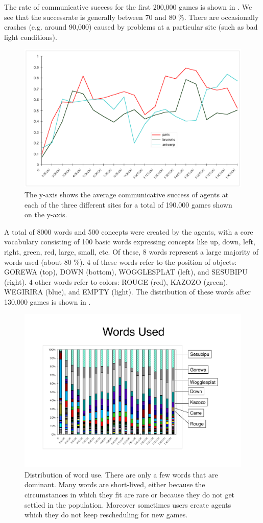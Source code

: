 The rate of communicative success for the first 200,000 games is shown in . We see that the successrate is generally between 70 and 80 \%. There are occasionally crashes (e.g. around 90,000) caused by problems at a particular site (such as bad light conditions). 


\begin{figure}[htbp]
  \centerline{\includegraphics[width=.80\textwidth]{chap8/figures/allsites}}
\caption{\label{fig:allsites} 
The y-axis shows the average communicative success of agents at each of the three different sites for a total 
of 190.000 games shown on the y-axis. 
}
\end{figure}

A total of 8000 words and 500 concepts were created by the agents, with a core vocabulary consisting of 100 basic words expressing concepts like up, down, left, right, green, red, large, small, etc. Of these, 8 words represent a large majority of words used (about 80 \%). 4 of these words refer to the position of objects: GOREWA (top), DOWN (bottom), WOGGLESPLAT (left), and SESUBIPU (right). 4 other words refer to colors: ROUGE (red), KAZOZO (green), WEGIRIRA (blue), and EMPTY (light). The distribution of these words after 130,000 games is shown in . 


\begin{figure}[htbp]
 \centerline{\includegraphics[width=.80\textwidth]{chap8/figures/words-used}}
\caption{\label{fig:words-used} 
Distribution of word use. There are only a few words that are dominant. Many words are 
short-lived, either because the circumstances 
in which they fit are rare or because they do not get settled in the population. Moreover sometimes users create agents 
which they do not keep rescheduling for new games. 
}
\end{figure}

